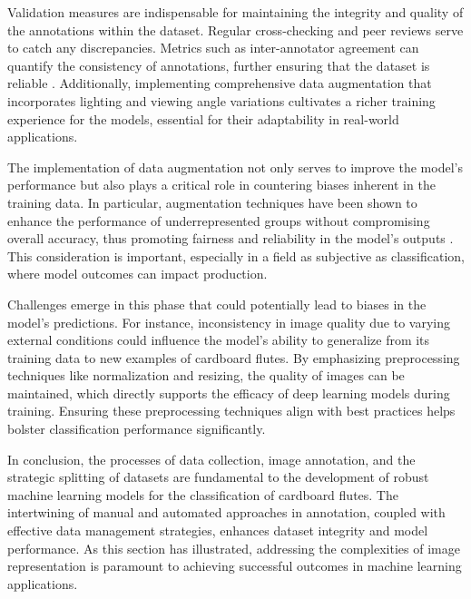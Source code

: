 Validation measures are indispensable for maintaining the integrity and quality of the annotations within the dataset. Regular cross-checking and peer reviews serve to catch any discrepancies. Metrics such as inter-annotator agreement can quantify the consistency of annotations, further ensuring that the dataset is reliable \cite{roh2019survey}. Additionally, implementing comprehensive data augmentation that incorporates lighting and viewing angle variations cultivates a richer training experience for the models, essential for their adaptability in real-world applications.



The implementation of data augmentation not only serves to improve the model's performance but also plays a critical role in countering biases inherent in the training data. In particular, augmentation techniques have been shown to enhance the performance of underrepresented groups without compromising overall accuracy, thus promoting fairness and reliability in the model's outputs \cite{he2016resnet}. This consideration is important, especially in a field as subjective as classification, where model outcomes can impact production.



Challenges emerge in this phase that could potentially lead to biases in the model's predictions. For instance, inconsistency in image quality due to varying external conditions could influence the model's ability to generalize from its training data to new examples of cardboard flutes. By emphasizing preprocessing techniques like normalization and resizing, the quality of images can be maintained, which directly supports the efficacy of deep learning models during training. Ensuring these preprocessing techniques align with best practices helps bolster classification performance significantly.



In conclusion, the processes of data collection, image annotation, and the strategic splitting of datasets are fundamental to the development of robust machine learning models for the classification of cardboard flutes. The intertwining of manual and automated approaches in annotation, coupled with effective data management strategies, enhances dataset integrity and model performance. As this section has illustrated, addressing the complexities of image representation is paramount to achieving successful outcomes in machine learning applications.


